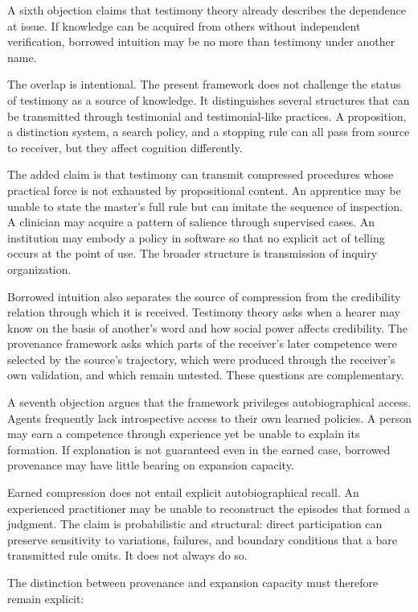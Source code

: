 \documentclass[11pt]{article}
\begin{document}
A sixth objection claims that testimony theory already describes the dependence at issue. If knowledge can be acquired from others without independent verification, borrowed intuition may be no more than testimony under another name.

The overlap is intentional. The present framework does not challenge the status of testimony as a source of knowledge. It distinguishes several structures that can be transmitted through testimonial and testimonial-like practices. A proposition, a distinction system, a search policy, and a stopping rule can all pass from source to receiver, but they affect cognition differently.

The added claim is that testimony can transmit compressed procedures whose practical force is not exhausted by propositional content. An apprentice may be unable to state the master's full rule but can imitate the sequence of inspection. A clinician may acquire a pattern of salience through supervised cases. An institution may embody a policy in software so that no explicit act of telling occurs at the point of use. The broader structure is transmission of inquiry organization.

Borrowed intuition also separates the source of compression from the credibility relation through which it is received. Testimony theory asks when a hearer may know on the basis of another's word and how social power affects credibility. The provenance framework asks which parts of the receiver's later competence were selected by the source's trajectory, which were produced through the receiver's own validation, and which remain untested. These questions are complementary.

A seventh objection argues that the framework privileges autobiographical access. Agents frequently lack introspective access to their own learned policies. A person may earn a competence through experience yet be unable to explain its formation. If explanation is not guaranteed even in the earned case, borrowed provenance may have little bearing on expansion capacity.

Earned compression does not entail explicit autobiographical recall. An experienced practitioner may be unable to reconstruct the episodes that formed a judgment. The claim is probabilistic and structural: direct participation can preserve sensitivity to variations, failures, and boundary conditions that a bare transmitted rule omits. It does not always do so.

The distinction between provenance and expansion capacity must therefore remain explicit:
\end{document}
